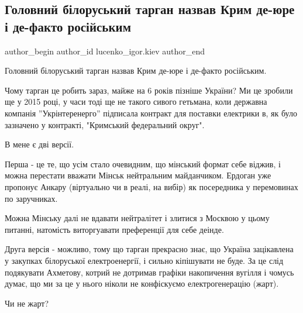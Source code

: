  
 
 
 
 
 
\subsection{Головний білоруський тарган назвав Крим де-юре і де-факто російським}
\label{sec:30_11_2021.fb.lucenko_igor.kiev.1.targan_belarus_krym}
 
\ifcmt
 author_begin
   author_id lucenko_igor.kiev
 author_end
\fi

Головний білоруський тарган назвав Крим де-юре і де-факто російським. 

Чому тарган це робить зараз, майже на 6 років пізніше України? Ми це зробили ще
у 2015 році, у часи тоді ще не такого сивого гетьмана, коли державна компанія
''Укрінтеренерго'' підписала контракт для поставки електрики в, як було
зазначено у контракті, "Кримський федеральний округ".

В мене є дві версії. 

Перша - це те, що усім стало очевидним, що мінський формат себе віджив, і можна
перестати вважати Мінськ нейтральним майданчиком. Ердоган уже пропонує Анкару
(віртуально чи в реалі, на вибір) як посередника у перемовинах по заручниках. 

Можна Мінську далі не вдавати нейтралітет і злитися з Москвою у цьому питанні,
натомість виторгуавати преференції для себе деінде.

Друга версія - можливо, тому що тарган прекрасно знає, що Україна зацікавлена у
закупках білоруської електроенергії, і сильно кіпішувати не буде. За це слід
подякувати Ахметову, котрий не дотримав графіки накопичення вугілля і чомусь
думає, що ми за це у нього ніколи не конфіскуємо електрогенерацію (жарт).

Чи не жарт?

